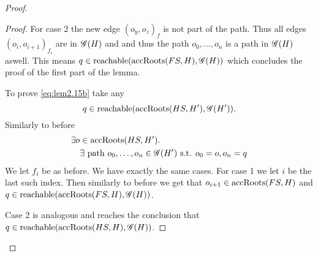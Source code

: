 \begin{proof}
\begin{description}
\begin{description}
\begin{description}
\begin{proof}
                For case 2 the new edge $(o_y, o_z)_f$ is not part of the path.
                Thus all edges $(o_i, o_{i+1})_{f_i}$ are in $\mathscr{G}(H)$ and and
                thus the path $o_0, \dots, o_n$ is a path in $\mathscr{G}(H)$ aswell.
                This means $q \in \mbox{$\mathrm{reachable}$}(\mbox{$\mathrm{accRoots}$}(FS, H), \mathscr{G}(H))$ which
                concludes the proof of the first part of the lemma.

                To prove \eqref{eq:lem2.15b} take any
                \begin{equation}
                  q \in \mbox{$\mathrm{reachable}$}(\mbox{$\mathrm{accRoots}$}(HS, H'), \mathscr{G}(H')).
                \end{equation}
                Similarly to before
                \begin{equation}
                  \begin{aligned}
                    \exists o &\in \mbox{$\mathrm{accRoots}$}(HS, H'). \\
                    & \exists \text{ path } o_0, \dots, o_n \in \mathscr{G}(H')
                    \text{ s.t. } o_0 = o, o_n = q
                  \end{aligned}
                \end{equation}
                We let $f_i$ be as before.
                We have exactly the same cases. For case 1 we let $i$ be the last
                such index. Then similarly to before we get that $o_{i+1} \in
                \mbox{$\mathrm{accRoots}$}(FS, H)$ and $q \in \mbox{$\mathrm{reachable}$}(\mbox{$\mathrm{accRoots}$}(FS, H),
                \mathscr{G}(H))$.
                
                Case 2 is analogous and reaches the conclusion that $q \in
                \mbox{$\mathrm{reachable}$}(\mbox{$\mathrm{accRoots}$}(HS, H), \mathscr{G}(H))$.


\end{proof}
\end{description}
\end{description}
\end{description}
\end{proof}

